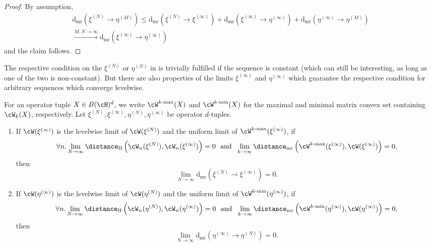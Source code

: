 \begin{proof}
  By assumption,
  \begin{multline*}
    \mathrm{d_{mr}}(\xi^{(N)}\to\eta^{(M)}) \leq  \mathrm{d_{mr}}(\xi^{(N)}\to\xi^{(\infty)}) +  \mathrm{d_{mr}}(\xi^{(\infty)}\to\eta^{(\infty)}) +  \mathrm{d_{mr}}(\eta^{(\infty)}\to\eta^{(M)}) \\\xrightarrow{M,N\to \infty}  \mathrm{d_{mr}}(\xi^{(\infty)}\to\eta^{(\infty)})
  \end{multline*}
  and the claim follows.
\end{proof}

The respective condition on the $\xi^{(N)}$ or $\eta^{(N)}$ in  is trivially fulfilled if the sequence is constant (which can still be interesting, as long as one of the two is non-constant).  But there are also properties of the limits $\xi^{(\infty)}$ and $\eta^{(\infty)}$ which guarantee the respective condition for arbitrary sequences which converge levelwise. 

\begin{proposition}
  For an operator tuple $X\in B(\cH)^d$, we write $\cW^{k\text{-$\max$}}(X)$ and $\cW^{k\text{-$\min$}}(X)$ for the maximal and minimal matrix convex set containing $\cW_k(X)$, respectively. Let $\xi^{(N)}, \xi^{(\infty)}, \eta^{(N)}, \eta^{(\infty)}$ be operator $d$-tuples. 
  \begin{enumerate}
  \item If $\cW(\xi^{(\infty)})$ is the levelwise limit of $\cW(\xi^{(N)})$ and the uniform limit of  $\cW^{k\text{-$\max$}}(\xi^{(\infty)})$, \ie if
  \[
     \forall n .  \lim_{N\to \infty} \distance_{\mathrm H}\left(\cW_n(\xi^{(N)}),\cW_n(\xi^{(\infty)})\right) = 0 
     \,\, \textrm{ and } \,\,
     \lim_{k\to\infty} \distance_{\mathrm{mr}} \left(\cW^{k\text{-$\max$}}(\xi^{(\infty)}), \cW(\xi^{(\infty)})\right) = 0 , 
  \]
  then
  \[
  \lim_{N \to \infty} \mathrm{d_{mr}}(\xi^{(N)}\to\xi^{(\infty)}) = 0 .
  \]
  \item If $\cW(\eta^{(\infty)})$ is the levelwise limit of $\cW(\eta^{(N)})$ and the uniform limit of  $\cW^{k\text{-$\min$}}(\eta^{(\infty)})$, \ie if
  \[
     \forall n .  \lim_{N\to \infty} \distance_{\mathrm H}\left(\cW_n(\eta^{(N)}),\cW_n(\eta^{(\infty)})\right) = 0
     \,\, \textrm{ and } \,\, 
     \lim_{k\to\infty} \distance_{\mathrm{mr}} \left(\cW^{k\text{-$\min$}}(\eta^{(\infty)}), \cW(\eta^{(\infty)})\right) = 0 , 
  \]
  then 
  \[
  \lim_{N \to \infty} \mathrm{d_{mr}}(\eta^{(\infty)}\to\eta^{(N)}) = 0 .
  \]
  
  \end{enumerate}
\end{proposition}

